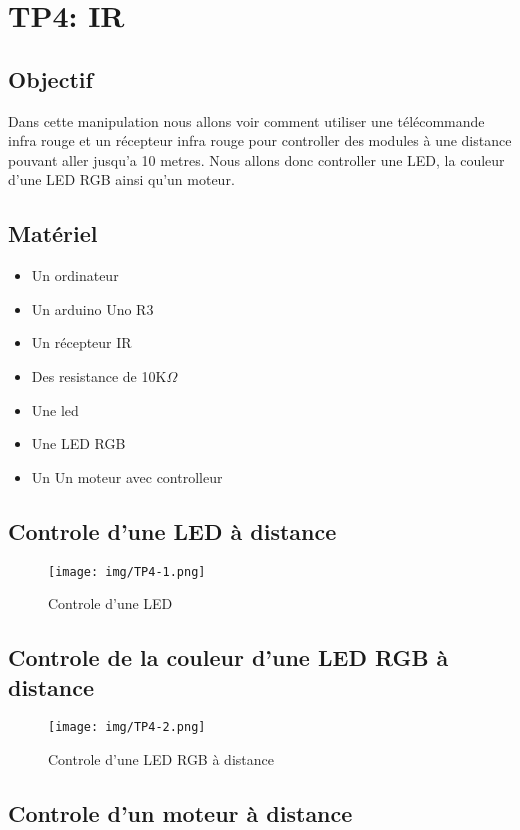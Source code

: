 \section{TP4: IR}
\subsection{Objectif}
Dans cette manipulation nous allons voir comment utiliser une télécommande infra rouge et un récepteur infra rouge pour controller des modules à une distance pouvant aller jusqu'a 10 metres. Nous allons donc controller une LED, la couleur d'une LED RGB ainsi qu'un moteur.
\subsection{Matériel}
\begin{itemize}
	\item Un ordinateur
	\item Un arduino Uno R3
	\item Un récepteur IR
	\item Des resistance de 10K$\Omega$
	\item Une led
	\item Une LED RGB
	\item Un Un moteur avec controlleur
\end{itemize}

\subsection{Controle d'une LED à distance}


\begin{figure}[H]
	\centering
	\texttt{[image: img/TP4-1.png]}
	\caption{\label{TP4.1}Controle d'une LED}
\end{figure}


\subsection{Controle de la couleur d'une LED RGB à distance}


\begin{figure}[H]
	\centering
	\texttt{[image: img/TP4-2.png]}
	\caption{\label{TP4.2}Controle d'une LED RGB à distance}
\end{figure}

\subsection{Controle d'un moteur à distance}

